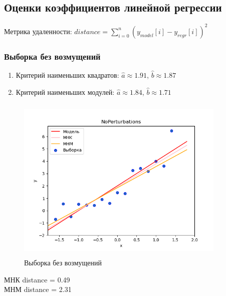 \subsection{Оценки коэффициентов линейной регрессии}
	
	Метрика удаленности: $distance = \sum_{i=0}^{n}(y_{model}[i]-y_{regr}[i])^2$
	\subsubsection{Выборка без возмущений}
		\begin{enumerate}
			\item{Критерий наименьших квадратов:}
			$\hat{a}\approx 1.91$, $\hat{b}\approx 1.87$
			\item{Критерий наименьших модулей:}
			$\hat{a}\approx 1.84$, $\hat{b}\approx 1.71$
		\end{enumerate}
		\begin{figure}[H]
			\centering
			\includegraphics[width = 10cm, height = 8cm]{pics/NoPerturbations.png}
			\caption{Выборка без возмущений}
			\label{w/o_pert}
		\end{figure}
		МНК distance = 0.49 \\
		МНМ distance = 2.31
	
